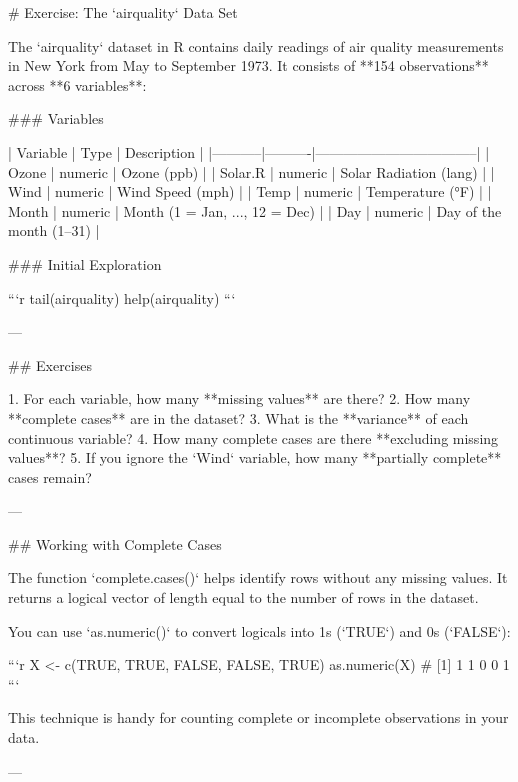 # Exercise: The `airquality` Data Set

The `airquality` dataset in R contains daily readings of air quality measurements in New York from May to September 1973. It consists of **154 observations** across **6 variables**:

### Variables

| Variable  | Type     | Description                       |
|-----------|----------|-----------------------------------|
| Ozone     | numeric  | Ozone (ppb)                       |
| Solar.R   | numeric  | Solar Radiation (lang)            |
| Wind      | numeric  | Wind Speed (mph)                  |
| Temp      | numeric  | Temperature (°F)                  |
| Month     | numeric  | Month (1 = Jan, ..., 12 = Dec)    |
| Day       | numeric  | Day of the month (1–31)           |

### Initial Exploration

```r
tail(airquality)
help(airquality)
```

---

## Exercises

1. For each variable, how many **missing values** are there?
2. How many **complete cases** are in the dataset?
3. What is the **variance** of each continuous variable?
4. How many complete cases are there **excluding missing values**?
5. If you ignore the `Wind` variable, how many **partially complete** cases remain?

---

## Working with Complete Cases

The function `complete.cases()` helps identify rows without any missing values. It returns a logical vector of length equal to the number of rows in the dataset.

You can use `as.numeric()` to convert logicals into 1s (`TRUE`) and 0s (`FALSE`):

```r
X <- c(TRUE, TRUE, FALSE, FALSE, TRUE)
as.numeric(X)
# [1] 1 1 0 0 1
```

This technique is handy for counting complete or incomplete observations in your data.

---
